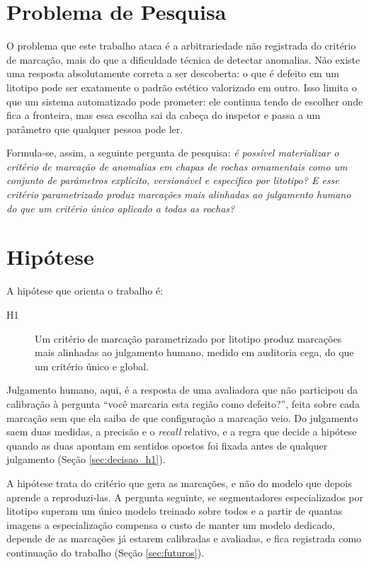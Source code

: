 \section{Problema de Pesquisa}
\label{sec:problema}

O problema que este trabalho ataca é a arbitrariedade não registrada do critério de marcação, mais do que a dificuldade técnica de detectar anomalias. Não existe uma resposta absolutamente correta a ser descoberta: o que é defeito em um litotipo pode ser exatamente o padrão estético valorizado em outro. Isso limita o que um sistema automatizado pode prometer: ele continua tendo de escolher onde fica a fronteira, mas essa escolha sai da cabeça do inspetor e passa a um parâmetro que qualquer pessoa pode ler.

Formula-se, assim, a seguinte pergunta de pesquisa: \textit{é possível materializar o critério de marcação de anomalias em chapas de rochas ornamentais como um conjunto de parâmetros explícito, versionável e específico por litotipo? E esse critério parametrizado produz marcações mais alinhadas ao julgamento humano do que um critério único aplicado a todas as rochas?}

\section{Hipótese}

A hipótese que orienta o trabalho é:

\begin{description}
  \item[H1] Um critério de marcação parametrizado por litotipo produz marcações mais alinhadas ao julgamento humano, medido em auditoria cega, do que um critério único e global.
\end{description}

Julgamento humano, aqui, é a resposta de uma avaliadora que não participou da calibração à pergunta ``você marcaria esta região como defeito?'', feita sobre cada marcação sem que ela saiba de que configuração a marcação veio. Do julgamento saem duas medidas, a precisão e o \textit{recall} relativo, e a regra que decide a hipótese quando as duas apontam em sentidos opostos foi fixada antes de qualquer julgamento (Seção \ref{sec:decisao_h1}).

A hipótese trata do critério que gera as marcações, e não do modelo que depois aprende a reproduzi-las. A pergunta seguinte, se segmentadores especializados por litotipo superam um único modelo treinado sobre todos e a partir de quantas imagens a especialização compensa o custo de manter um modelo dedicado, depende de as marcações já estarem calibradas e avaliadas, e fica registrada como continuação do trabalho (Seção \ref{sec:futuros}).

